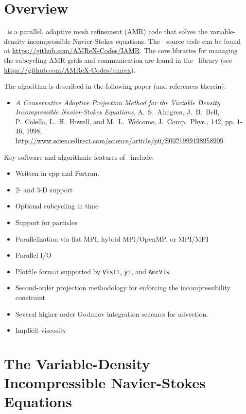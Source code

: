 \section{Overview}

\iamr\ is a parallel, adaptive mesh refinement (AMR) code that 
solves the variable-density incompressible Navier-Stokes equations.
The \iamr\ source code can be found at
\url{https://github.com/AMReX-Codes/IAMR}.
The core libraries for managing the subcycling AMR
grids and communication are found in the \amrex\ library
(see \url{https://github.com/AMReX-Codes/amrex}).

The algorithm is described in the following paper (and references therein):
\begin{itemize}

\item {\it A Conservative Adaptive Projection Method for the Variable Density Incompressible Navier-Stokes Equations},
A.~S.~Almgren, J.~B.~Bell, P.~Colella, L.~H.~Howell, and M.~L.~Welcome,
J.~Comp.~Phys., 142, pp. 1-46, 1998.
\url{http://www.sciencedirect.com/science/article/pii/S0021999198958909} \cite{IAMR}

\end{itemize}  

Key software and algorithmic features of \iamr\ include:
\begin{itemize}
\item Written in {\sf cpp} and {\sf Fortran}.
\item 2- and 3-D support
\item Optional subcycling in time
\item Support for particles
\item Parallelization via flat MPI, hybrid MPI/OpenMP, or MPI/MPI
\item Parallel I/O
\item Plotfile format supported by {\tt VisIt}, {\tt yt}, and {\tt AmrVis}
\item Second-order projection methodology for enforcing the incompressibility constraint
\item Several higher-order Godunov integration schemes for advection.
\item Implicit viscosity
\end{itemize}

\section{The Variable-Density Incompressible Navier-Stokes Equations}

